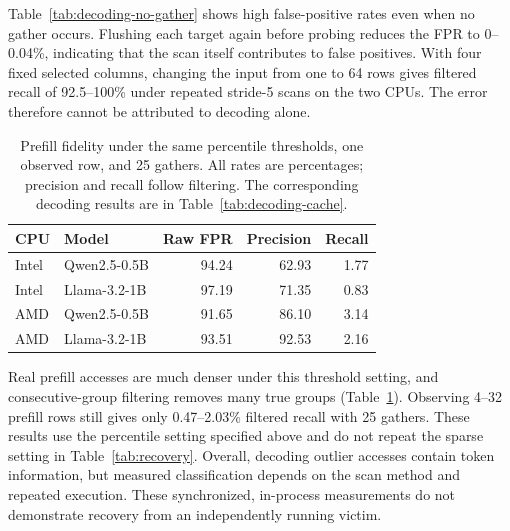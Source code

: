 Table~\ref{tab:decoding-no-gather} shows high false-positive rates even when no gather occurs.
Flushing each target again before probing reduces the FPR to 0--0.04\%, indicating that the scan itself contributes to false positives.
With four fixed selected columns, changing the input from one to 64 rows gives filtered recall of 92.5--100\% under repeated stride-5 scans on the two CPUs.
The error therefore cannot be attributed to decoding alone.

\begin{table}[H]
    \centering\footnotesize\setlength{\tabcolsep}{3pt}
    \caption{Prefill fidelity under the same percentile thresholds, one observed row, and 25 gathers. All rates are percentages; precision and recall follow filtering. The corresponding decoding results are in Table~\ref{tab:decoding-cache}.}
    \label{tab:decoding-prefill}
    \begin{tabular}{llrrr}
        \hline
        CPU & Model & Raw FPR & Precision & Recall \\\hline
        Intel & Qwen2.5-0.5B & 94.24 & 62.93 & 1.77 \\
        Intel & Llama-3.2-1B & 97.19 & 71.35 & 0.83 \\
        AMD & Qwen2.5-0.5B & 91.65 & 86.10 & 3.14 \\
        AMD & Llama-3.2-1B & 93.51 & 92.53 & 2.16 \\
        \hline
    \end{tabular}
\end{table}

Real prefill accesses are much denser under this threshold setting, and consecutive-group filtering removes many true groups (Table~\ref{tab:decoding-prefill}).
Observing 4--32 prefill rows still gives only 0.47--2.03\% filtered recall with 25 gathers.
These results use the percentile setting specified above and do not repeat the sparse setting in Table~\ref{tab:recovery}.
Overall, decoding outlier accesses contain token information, but measured classification depends on the scan method and repeated execution.
These synchronized, in-process measurements do not demonstrate recovery from an independently running victim.
